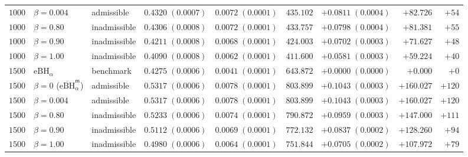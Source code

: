 \begin{table}[t]
\begin{adjustbox}{max width=\textwidth}
\begin{tabular}{@{}rllrrrrrr@{}}
$1000$ & $\beta=0.004$ & admissible & $0.4320\;(0.0007)$ & $0.0072\;(0.0001)$ & $435.102$ & $+0.0811\;(0.0004)$ & $+82.726$ & $+54$ \\
$1000$ & $\beta=0.80$ & inadmissible & $0.4306\;(0.0008)$ & $0.0072\;(0.0001)$ & $433.757$ & $+0.0798\;(0.0004)$ & $+81.381$ & $+55$ \\
$1000$ & $\beta=0.90$ & inadmissible & $0.4211\;(0.0008)$ & $0.0068\;(0.0001)$ & $424.003$ & $+0.0702\;(0.0003)$ & $+71.627$ & $+48$ \\
$1000$ & $\beta=1.00$ & inadmissible & $0.4090\;(0.0008)$ & $0.0062\;(0.0001)$ & $411.600$ & $+0.0581\;(0.0003)$ & $+59.224$ & $+40$ \\
\addlinespace[3pt]
$1500$ & $\mathrm{eBH}_\alpha$ & benchmark & $0.4275\;(0.0006)$ & $0.0041\;(0.0001)$ & $643.872$ & $+0.0000\;(0.0000)$ & $+0.000$ & $+0$ \\
$1500$ & $\beta=0$ ($\overline{\mathrm{eBH}}_\alpha^{\mathsf m}$) & admissible & $0.5317\;(0.0006)$ & $0.0078\;(0.0001)$ & $803.899$ & $+0.1043\;(0.0003)$ & $+160.027$ & $+120$ \\
$1500$ & $\beta=0.004$ & admissible & $0.5317\;(0.0006)$ & $0.0078\;(0.0001)$ & $803.899$ & $+0.1043\;(0.0003)$ & $+160.027$ & $+120$ \\
$1500$ & $\beta=0.80$ & inadmissible & $0.5233\;(0.0006)$ & $0.0074\;(0.0001)$ & $790.872$ & $+0.0959\;(0.0003)$ & $+147.000$ & $+111$ \\
$1500$ & $\beta=0.90$ & inadmissible & $0.5112\;(0.0006)$ & $0.0069\;(0.0001)$ & $772.132$ & $+0.0837\;(0.0002)$ & $+128.260$ & $+94$ \\
$1500$ & $\beta=1.00$ & inadmissible & $0.4980\;(0.0006)$ & $0.0064\;(0.0001)$ & $751.844$ & $+0.0705\;(0.0002)$ & $+107.972$ & $+79$ \\
\bottomrule
\end{tabular}
\end{adjustbox}
\end{table}
